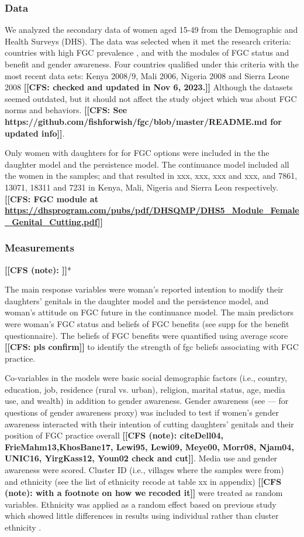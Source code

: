 \documentclass[12pt,]{article}
\newcommand{\comment}[1]{\textbf{[[#1]]}}
\newcommand{\cfcmt}[1]{\comment{CFS: #1}}
\newcommand{\cfonly}[1]{\comment{CFS (note): #1}}
\begin{document}
\subsubsection{Data}\label{data}

We analyzed the secondary data of women aged 15-49 from the Demographic and Health Surveys (DHS).  The data was selected when it met the research criteria:  countries with high FGC prevalence \cite{UNIC16}, and with the modules of FGC status and benefit and gender awareness. Four countries qualified under this criteria with the most recent data sets: Kenya 2008/9, Mali 2006, Nigeria 2008 and Sierra Leone 2008 \cfcmt{checked and updated in Nov 6, 2023.}   Although the datasets seemed outdated, but it should not affect the study object which was about FGC norms and behaviors.  \cfcmt{See https://github.com/fishforwish/fgc/blob/master/README.md for updated info}.

Only women with daughters for for FGC options were included in the the daughter model and the persistence model.   The continuance model included all the women in the samples; and that resulted in xxx, xxx, xxx and xxx, and 7861, 13071, 18311 and 7231 in Kenya, Mali, Nigeria and Sierra Leon respectively.  \cfcmt{FGC module at \url{https://dhsprogram.com/pubs/pdf/DHSQMP/DHS5_Module_Female_Genital_Cutting.pdf}}

\subsubsection{Measurements}\label{measurements}

\cfonly{\cite{Rima08}}*

The main response variables were woman's reported intention to modify their daughters’ genitals in the daughter model and the persistence model, and woman's attitude on FGC future in the continuance model.  The main predictors were woman's FGC status and beliefs of FGC benefits (see supp for the benefit questionnaire).  The beliefs of FGC benefits were quantified using average score \cfcmt{pls confirm} to identify the strength of fgc beliefs associating with FGC practice.

Co-variables in the models were basic social demographic factors (i.e., country, education, job, residence (rural vs. urban), religion, marital status, age, media use, and wealth) in addition to gender awareness.  Gender awareness (see — for questions of gender awareness proxy) was included to test if women’s gender awareness interacted with their intention of cutting daughters’ genitals and their position of FGC practice overall \cfonly{cite{Dell04, FrieMahm13,KhosBane17, Lewi95, Lewi09, Meye00, Morr08, Njam04, UNIC16, YirgKass12, Youn02} check and cut}.  Media use and gender awareness were scored.  Cluster ID (i.e., villages where the samples were from) and ethnicity (see the list of ethnicity recode at table xx in appendix) \cfonly{with a footnote on how we recoded it} were treated as random variables.  Ethnicity was applied as a random effect based on previous study which showed little differences in results using individual rather than cluster ethnicity \cite{Hayf05}.
\end{document}
